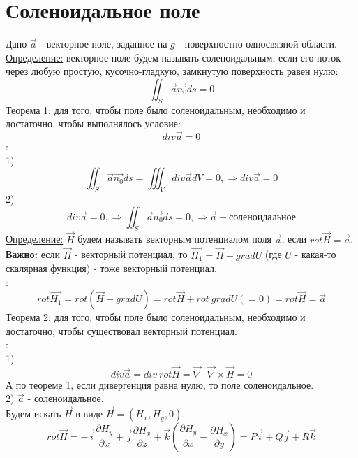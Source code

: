 \documentclass[12pt]{article}
\begin{document}
\section{Соленоидальное поле}
Дано $\overrightarrow{a}$ - векторное поле, заданное на $g$ - поверхностно-односвязной области.\\
\uline{Определение:} векторное поле будем называть соленоидальным, если его поток через любую простую, кусочно-гладкую, замкнутую поверхность равен нулю:\\
$$\iint_S \overrightarrow{a} \overrightarrow{n_0} ds = 0$$
\uline{Теорема 1:} для того, чтобы поле было соленоидальным, необходимо и достаточно, чтобы выполнялось условие:\\
$$div \overrightarrow{a} = 0$$
:\\
1) $$\iint_S \overrightarrow{a} \overrightarrow{n_0} ds = \iiint_V div \overrightarrow{a} d V = 0, \Rightarrow div \overrightarrow{a} = 0$$
2) $$div \overrightarrow{a} = 0, \Rightarrow \iint_S \overrightarrow{a} \overrightarrow{n_0} ds = 0, \Rightarrow \overrightarrow{a} - \text{соленоидальное}$$
\uline{Определение:} $\overrightarrow{H}$ будем называть векторным потенциалом поля $\overrightarrow{a}$, если $rot \overrightarrow{H} = \overrightarrow{a}$.\\
\textbf{Важно:} если $\overrightarrow{H}$ - векторный потенциал, то $\overrightarrow{H_1} = \overrightarrow{H} + gradU$ (где $U$ - какая-то скалярная функция) - тоже векторный потенциал.\\
:\\
$$rot \overrightarrow{H_1} = rot (\overrightarrow{H} + gradU) = rot \overrightarrow{H} + rot \ gradU (=0) = rot \overrightarrow{H} = \overrightarrow{a}$$
\uline{Теорема 2:} для того, чтобы поле было соленоидальным, необходимо и достаточно, чтобы существовал векторный потенциал.\\
:\\
1) $$div \overrightarrow{a} = div \ rot \overrightarrow{H} = \overrightarrow{\nabla} \cdot \overrightarrow{\nabla} \times \overrightarrow{H} = 0$$
А по теореме 1, если дивергенция равна нулю, то поле соленоидальное.\\
2) $\overrightarrow{a}$ - соленоидальное.\\
Будем искать $\overrightarrow{H}$ в виде $\overrightarrow{H} = (H_x, H_y, 0)$.\\
$$rot \overrightarrow{H} = -\overrightarrow{i} \frac{\partial H_y}{\partial x} + \overrightarrow{j} \frac{\partial H_x}{\partial z} + \overrightarrow{k} (\frac{\partial H_y}{\partial x} - \frac{\partial H_x}{\partial y}) = P\overrightarrow{i} + Q\overrightarrow{j}+R\overrightarrow{k}$$
\end{document}
